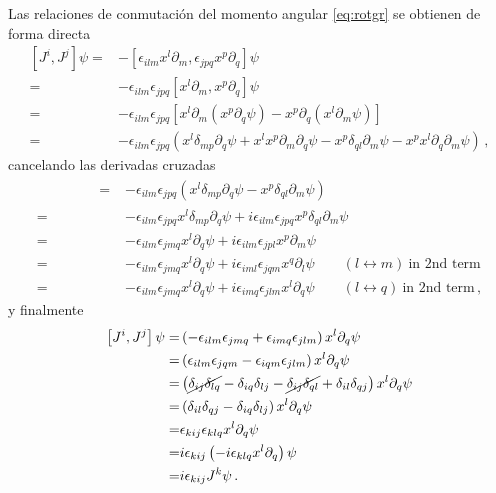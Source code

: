 \begin{subappendices}
Las relaciones de conmutación del momento angular \eqref{eq:rotgr} se obtienen de forma directa
\begin{align*}
  \left[ J^i,J^j \right]\psi=&-\left[ \epsilon_{ilm}x^{l}\partial_m ,\epsilon_{jpq}x^{p}\partial_q \right]\psi \nonumber\\
=&-\epsilon_{ilm}\epsilon_{jpq}\left[ x^{l}\partial_m ,x^{p}\partial_q \right]\psi \nonumber\\
=&-\epsilon_{ilm}\epsilon_{jpq}\left[ x^{l}\partial_m \left(x^{p}\partial_q\psi  \right)-x^{p}\partial_q \left( x^{l}\partial_m\psi \right) \right] \nonumber\\
   =&-\epsilon_{ilm}\epsilon_{jpq}\left( x^{l}\delta_{mp}\partial_q\psi +x^{l}x^{p}\partial_m \partial_q\psi  -x^{p}\delta_{ql}\partial_m\psi-x^{p}  x^{l}\partial_q\partial_m\psi \right)\,,
\end{align*}
cancelando las derivadas cruzadas
\begin{align*}
\phantom{\left[ J^i,J^j \right]\psi}   =&-\epsilon_{ilm}\epsilon_{jpq}\left( x^{l}\delta_{mp}\partial_q\psi   -x^{p}\delta_{ql}\partial_m\psi \right) \nonumber\\
   =&-\epsilon_{ilm}\epsilon_{jpq} x^{l}\delta_{mp}\partial_q\psi +i\epsilon_{ilm}\epsilon_{jpq}x^{p}\delta_{ql}\partial_m\psi \nonumber\\
   =&-\epsilon_{ilm}\epsilon_{jmq} x^{l}\partial_q\psi +i\epsilon_{ilm}\epsilon_{jpl}x^{p}\partial_m\psi \nonumber\\
   =&-\epsilon_{ilm}\epsilon_{jmq} x^{l}\partial_q\psi +i\epsilon_{iml}\epsilon_{jqm}x^{q}\partial_l\psi \qquad (l\leftrightarrow m)\ \text{in 2nd term}\nonumber\\
   =&-\epsilon_{ilm}\epsilon_{jmq} x^{l}\partial_q\psi +i\epsilon_{imq}\epsilon_{jlm}x^{l}\partial_q\psi  \qquad (l\leftrightarrow q)\ \text{in 2nd term}\,,
\end{align*}
y finalmente
\begin{align*}
  \left[ J^i,J^j \right]\psi  =& \left(-\epsilon_{ilm}\epsilon_{jmq}+\epsilon_{imq}\epsilon_{jlm}  \right) x^{l}\partial_q\psi \nonumber\\
   =& \left(\epsilon_{ilm}\epsilon_{jqm}-\epsilon_{iqm}\epsilon_{jlm}  \right) x^{l}\partial_q\psi \nonumber\\
   =& \left(\cancel{\delta_{ij}\delta_{lq}}-\delta_{iq}\delta_{lj}-\cancel{\delta_{ij}\delta_{ql}}+\delta_{il}\delta_{qj}  \right) x^{l}\partial_q\psi \nonumber\\
  =& \left(\delta_{il}\delta_{qj}-\delta_{iq}\delta_{lj}  \right) x^{l}\partial_q\psi \nonumber\\
  =& \epsilon_{kij}\epsilon_{klq} x^{l}\partial_q\psi \nonumber\\
  =&i \epsilon_{kij}\left(-i\epsilon_{klq} x^{l}\partial_q  \right)\psi \nonumber\\
  =&i \epsilon_{kij}J^{k}\psi \,.
\end{align*}


\end{subappendices}

